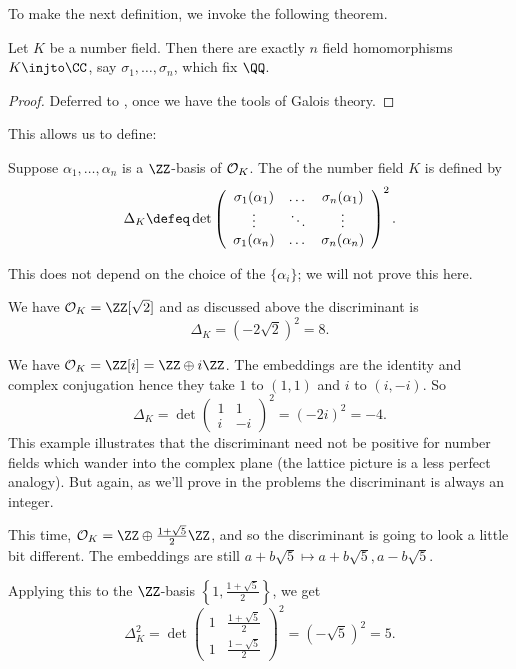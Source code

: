 To make the next definition, we invoke the following theorem.
\begin{theorem}
	Let $K$ be a number field.
	Then there are exactly $n$ field homomorphisms $K \injto \CC$,
	say $\sigma_1, \dots, \sigma_n$, which fix $\QQ$.
\end{theorem}
\begin{proof}
	Deferred to , once we have the tools of Galois theory.
\end{proof}
This allows us to define:
\begin{definition}
	Suppose $\alpha_1, \dots, \alpha_n$ is a $\ZZ$-basis of $\mathcal O_K$.
	The  of the number field $K$ is defined by
	\[
	\Delta_K \defeq \det \left(
	\begin{array}{ccc}
		\sigma_1(\alpha_1) & \dots & \sigma_n(\alpha_1) \\
		\vdots & \ddots & \vdots \\
		\sigma_1(\alpha_n) & \dots & \sigma_n(\alpha_n) \\
	\end{array}
	\right)^2.
	\]
\end{definition}
This does not depend on the choice of the $\{\alpha_i\}$;
we will not prove this here.
\begin{example}[Discriminant of $K = \QQ(\sqrt2)$]
	We have $\OO_K = \ZZ[\sqrt 2]$
	and as discussed above the discriminant is
	\[
		\Delta_K = 
		(-2 \sqrt 2)^2 = 8.
	\]
\end{example}
\begin{example}[Discriminant of $\QQ(i)$]
	We have $\OO_K = \ZZ[i] = \ZZ \oplus i \ZZ$.
	The embeddings are the identity and complex conjugation
	hence they take $1$ to $(1,1)$ and $i$ to $(i, -i)$.
	So
	\[
		\Delta_K = 
		\det \left(
		\begin{array}{cc}
			1 & 1 \\
			i & -i
		\end{array}
		\right)^2
		=
		(-2i)^2 = -4.
	\]
	This example illustrates that the discriminant need not be positive
	for number fields which wander into the complex plane
	(the lattice picture is a less perfect analogy).
	But again, as we'll prove in the problems the discriminant is always
	an integer.
\end{example}
\begin{example}
	This time, $\OO_K = \ZZ \oplus \frac{1+\sqrt5}{2} \ZZ$, and so the discriminant
	is going to look a little bit different.
	The embeddings are still $a+b\sqrt 5 \mapsto a+b\sqrt5, a-b\sqrt5$.

	Applying this to the $\ZZ$-basis $\left\{ 1, \frac{1+\sqrt5}{2} \right\}$, we get
	\[
		\Delta_K^2
		=
		\det
		\left(
		\begin{array}{cc}
			1 & \frac{1+\sqrt5}{2} \\
			1 & \frac{1-\sqrt5}{2}
		\end{array}
		\right)^2
		= (-\sqrt 5)^2 = 5.
	\]
\end{example}
